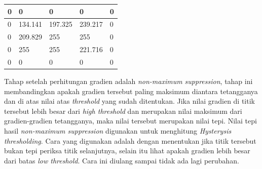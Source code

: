 \begin{table}[H]
	\centering
	\begin{small}
		\begin{tabular}{|p{2cm}|p{2cm}|p{2cm}|p{2cm}|p{2cm}|}
			\hline
			0 & 0 & 0 & 0 & 0 \\
			\hline
			0 & 134.141 & 197.325 & 239.217 & 0 \\
			\hline
			0 & 209.829 & 255 & 255 & 0 \\
			\hline
			0 & 255 & 255 & 221.716 & 0 \\
			\hline
			0 & 0 & 0 & 0 & 0 \\
			\hline
		\end{tabular}
	\end{small}
	\label{fig:MatriksCitraHasilPerhitunganGradien}
\end{table}

\noindent Tahap setelah perhitungan gradien adalah \textit{non-maximum suppression}, tahap ini membandingkan apakah gradien tersebut paling maksimum diantara tetangganya dan di atas nilai atas \textit{threshold} yang sudah ditentukan. Jika nilai gradien di titik tersebut lebih besar dari \textit{high threshold} dan merupakan nilai maksimum dari gradien-gradien tetangganya, maka nilai tersebut merupakan nilai tepi. Nilai tepi hasil \textit{non-maximum suppression} digunakan untuk menghitung \textit{Hysterysis thresholding}. Cara yang digunakan adalah dengan menentukan jika titik tersebut bukan tepi periksa titik selanjutnya, selain itu lihat apakah gradien lebih besar dari batas \textit{low threshold}. Cara ini diulang sampai tidak ada lagi perubahan.\\

